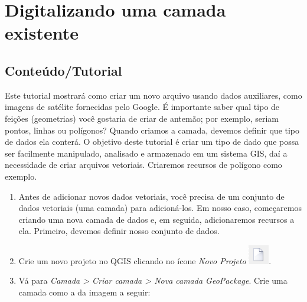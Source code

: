 \documentclass[
  portuguese,
]{krantz}
\providecommand{\tightlist}{%
  \setlength{\itemsep}{0pt}\setlength{\parskip}{0pt}}
\begin{document}
\hypertarget{digitalizando-uma-camada-existente}{%
\section{Digitalizando uma camada existente}\label{digitalizando-uma-camada-existente}}

\hypertarget{conteuxfadotutorial-5}{%
\subsection{\texorpdfstring{\textbf{Conteúdo/Tutorial}}{Conteúdo/Tutorial}}\label{conteuxfadotutorial-5}}

Este tutorial mostrará como criar um novo arquivo usando dados auxiliares, como imagens de satélite fornecidas pelo Google. É importante saber qual tipo de feições (geometrias) você gostaria de criar de antemão; por exemplo, seriam pontos, linhas ou polígonos? Quando criamos a camada, devemos definir que tipo de dados ela conterá. O objetivo deste tutorial é criar um tipo de dado que possa ser facilmente manipulado, analisado e armazenado em um sistema GIS, daí a necessidade de criar arquivos vetoriais. Criaremos recursos de polígono como exemplo.

\begin{enumerate}
\def\labelenumi{\arabic{enumi}.}
\tightlist
\item
  Antes de adicionar novos dados vetoriais, você precisa de um conjunto de dados vetoriais (uma camada) para adicioná-los. Em nosso caso, começaremos criando uma nova camada de dados e, em seguida, adicionaremos recursos a ela. Primeiro, devemos definir nosso conjunto de dados.
\item
  Crie um novo projeto no QGIS clicando no ícone \emph{Novo Projeto} \includegraphics{media/modulo7/new-project.png}.
\item
  Vá para \emph{Camada \textgreater{} Criar camada \textgreater{} Nova camada GeoPackage}. Crie uma camada como a da imagem a seguir:
\end{enumerate}
\end{document}
